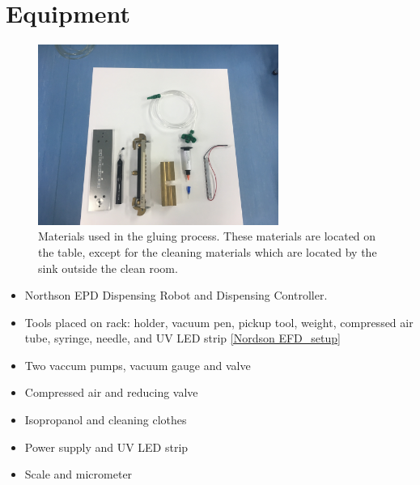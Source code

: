 \documentclass[12pt]{cnihepsop}
\begin{document}
\section{Equipment}
\begin{center}
\begin{figure}[h]
\includegraphics[width=0.7\textwidth]{img/GlueMaterials.jpg}
\caption{Materials used in the gluing process. These materials are located on the table, except for the cleaning materials which are located by the sink outside the clean room.}
\label{materials}
\end{figure}
\end{center}

\begin{itemize}
    \item Northson EPD Dispensing Robot and Dispensing Controller. 
    \item Tools placed on rack: holder, vacuum pen, pickup tool, weight, compressed air tube, syringe, needle, and UV LED strip  \ref{Nordson EFD_setup}
    \item Two vaccum pumps, vacuum gauge and valve
	\item Compressed air and reducing valve
    \item Isopropanol and cleaning clothes
    \item Power supply and UV LED strip
    \item Scale and micrometer
\end{itemize}
\end{document}
